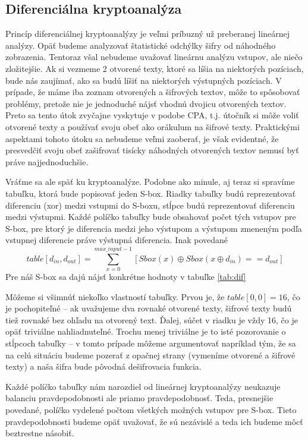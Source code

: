 \subsection{Diferenciálna kryptoanalýza}
Princíp diferenciálnej kryptoanalýzy je veľmi príbuzný 
už preberanej lineárnej analýzy. Opäť budeme analyzovať
štatistické odchýlky šifry od náhodného zobrazenia.
Tentoraz všal nebudeme uvažovať lineárnu analýzu vstupov,
ale niečo zložitejšie. Ak si vezmeme 2 otvorené texty, ktoré sa líšia
na niektorých pozíciach, bude nás zaujímať, ako sa budú líšiť na
niektorých výstupných pozíciach. V prípade, že máme iba zoznam
otvorených a šifrových textov, môže to spôsobovať problémy, pretože
nie je jednoduché nájsť vhodnú dvojicu otvorených textov.
Preto sa tento útok zvyčajne vyskytuje v podobe CPA, t.j. útočník si
môže voliť otvorené texty a používať svoju obeť ako orákulum na
šifrové texty. Praktickými aspektami tohoto útoku sa nebudeme veľmi
zaoberať, je však evidentné, že presvedčiť svoju obeť zašifrovať
tisícky náhodných otvorených textov nemusí byť práve najjednoduchšie.

Vráťme sa ale späť ku kryptoanalýze. Podobne ako minule, aj teraz si
spravíme tabuľku, ktorá bude popisovať jeden S-box. 
Riadky tabuľky budú reprezentovať diferenciu (xor) medzi vstupmi do
S-boxu, stĺpce budú reprezentovať diferenciu medzi výstupmi. Každé
políčko tabuľky bude obsahovať počet tých vstupov pre S-box, pre ktorý
je diferencia medzi jeho výstupom a výstupom zmeneným podľa vstupnej
diferencie práve výstupná diferencia. Inak povedané
\begin{equation*}
    table[d_{in},d_{out}] = \sum_{x=0}^{max\_input-1}
        \left[Sbox(x) \oplus Sbox(x \oplus d_{in}) == d_{out}\right]
\end{equation*}
Pre náš S-box sa dajú nájsť konkrétne hodnoty v tabuľke \ref{tab:dif}


Môžeme si všimnúť niekoľko vlastností tabuľky.
Prvou je, že $table[0,0]=16$, čo je pochopiteľné -- ak uvažujeme dva
rovnaké otvorené texty, šifrové texty budú tiež rovnaké bez ohľadu na
otvorený text. Ďalej, súčet v riadku je vždy 16, čo je opäť triviálne
nahliadnuteľné. Trochu menej triviálne je to isté pozorovanie o
stĺpcoch tabuľky -- v tomto prípade môžeme argumentovať napríklad tým,
že sa na celú situáciu budeme pozerať z opačnej strany (vymeníme
otvorené a šifrové texty) a naša šifra bude pôvodná dešifrovacia funkcia.

Každé políčko tabuľky nám narozdiel od lineárnej kryptoanalýzy
neukazuje balanciu pravdepodobnosti ale priamo pravdepodobnosť. Teda,
presnejšie povedané, políčko vydelené počtom všetkých možných vstupov
pre S-box.
Tieto pravdepodobnosti budeme opäť uvažovať, že sú nezávislé a teda
ich budeme môcť beztrestne násobiť.



